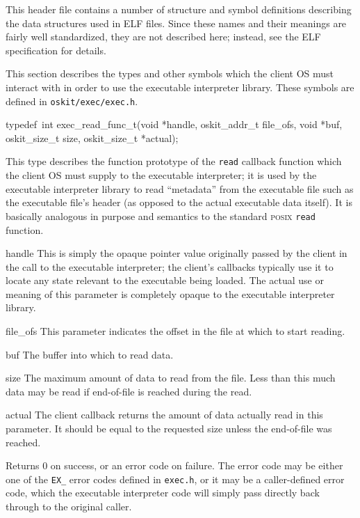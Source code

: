 \begin{apidesc}
	This header file contains a number of
	structure and symbol definitions
	describing the data structures used in ELF files.
	Since these names and their meanings
	are fairly well standardized,
	they are not described here;
	instead, see the ELF specification for details.
\end{apidesc}

\label{exec-types}

This section describes the types and other symbols
which the client OS must interact with
in order to use the executable interpreter library.
These symbols are defined in \texttt{oskit/exec/exec.h}.

\label{exec-read}
\begin{apisyn}

	\funcproto typedef~int exec_read_func_t(void *handle,
		oskit_addr_t file_ofs, void *buf, oskit_size_t size,
		\outparam oskit_size_t *actual);
\end{apisyn}
\begin{apidesc}
	This type describes the function prototype
	of the \texttt{read} callback function
	which the client OS must supply to the executable interpreter;
	it is used by the executable interpreter library
	to read ``metadata'' from the executable file
	such as the executable file's header
	(as opposed to the actual executable data itself).
	It is basically analogous in purpose and semantics
	to the standard \textsc{posix} \texttt{read} function.
\end{apidesc}
\begin{apiparm}
	\item[handle]
		This is simply the opaque pointer value
		originally passed by the client
		in the call to the executable interpreter;
		the client's callbacks typically use it
		to locate any state relevant to the executable being loaded.
		The actual use or meaning of this parameter
		is completely opaque to the executable interpreter library.
	\item[file_ofs]
		This parameter indicates
		the offset in the file at which to start reading.
	\item[buf]
		The buffer into which to read data.
	\item[size]
		The maximum amount of data to read from the file.
		Less than this much data may be read
		if end-of-file is reached during the read.
	\item[actual]
		The client callback returns
		the amount of data actually read in this parameter.
		It should be equal to the requested size
		unless the end-of-file was reached.
\end{apiparm}
\begin{apiret}
	Returns 0 on success,
	or an error code on failure.
	The error code may be either
	one of the \texttt{EX_} error codes
	defined in \texttt{exec.h},
	or it may be a caller-defined error code,
	which the executable interpreter code
	will simply pass directly back through to the original caller.
\end{apiret}


